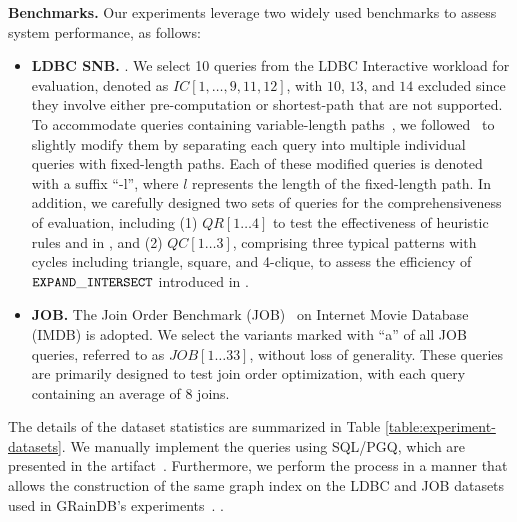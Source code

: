 \noindent\textbf{Benchmarks.} Our experiments leverage two widely used benchmarks to assess system performance, as follows:
\begin{itemize}
    \item \textbf{LDBC SNB.} .
    We select 10 queries from the LDBC Interactive workload for evaluation, denoted as $IC[1, \ldots, 9, 11, 12]$, with $10$, $13$, and $14$ excluded since they involve either pre-computation or shortest-path that are not supported.
    To accommodate queries containing variable-length paths~\cite{graindb}, we followed~\cite{graindb} to slightly modify them by separating each query into multiple individual queries with fixed-length paths. Each of these modified queries is denoted with a suffix ``-l'', where $l$ represents the length of the fixed-length path. In addition, we carefully designed two sets of queries for the comprehensiveness of evaluation, including (1) $QR[1\ldots 4]$ to test the effectiveness of heuristic rules \filterrule and \joinfuserule in \name, and (2) $QC[1\ldots 3]$, comprising three typical patterns with cycles including triangle, square, and 4-clique, to assess the efficiency of $\texttt{EXPAND}\_\texttt{INTERSECT}$ introduced in .
    \item \textbf{JOB.} The Join Order Benchmark (JOB)~\cite{job_snb} on Internet Movie Database (IMDB) is adopted. We select the variants marked with ``a'' of all JOB queries, referred to as $JOB[1\ldots 33]$, without loss of generality. These queries are primarily designed to test join order optimization, with each query containing an average of $8$ joins.
\end{itemize}
The details of the dataset statistics are summarized in Table \ref{table:experiment-datasets}.
We manually implement the queries using SQL/PGQ, which are presented in the artifact~\cite{artifact}.
Furthermore, we perform the \rgmapping process in a manner that allows the construction of the same graph index on the LDBC and JOB datasets used in GRainDB's experiments~\cite{graindb}.
.


